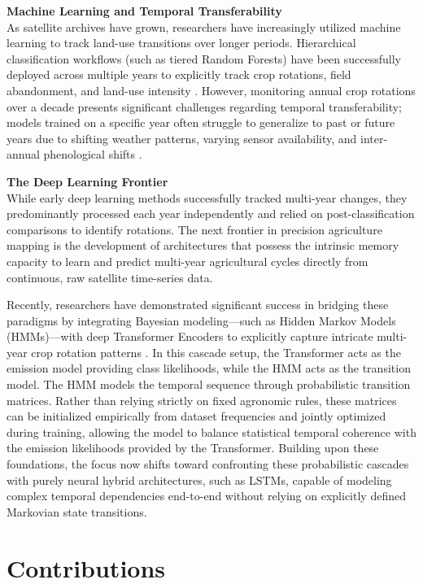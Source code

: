 \textbf{Machine Learning and Temporal Transferability} \\
As satellite archives have grown, researchers have increasingly utilized machine learning to track land-use transitions over longer periods.
Hierarchical classification workflows (such as tiered Random Forests) have been successfully deployed across multiple years to explicitly track crop rotations,
field abandonment, and land-use intensity \cite{brickner_field_2025}.
However, monitoring annual crop rotations over a decade presents significant challenges regarding temporal transferability;
models trained on a specific year often struggle to generalize to past or future years due to shifting weather patterns,
varying sensor availability, and inter-annual phenological shifts \cite{pham_temporally_2024}. 

\textbf{The Deep Learning Frontier} \\
While early deep learning methods successfully tracked multi-year changes,
they predominantly processed each year independently and relied on post-classification comparisons to identify rotations.
The next frontier in precision agriculture mapping is the development of architectures that possess the intrinsic memory capacity to learn
and predict multi-year agricultural cycles directly from continuous, raw satellite time-series data.

Recently, researchers have demonstrated significant success in bridging these paradigms by integrating Bayesian modeling---such
as Hidden Markov Models (HMMs)---with deep Transformer Encoders to explicitly capture intricate multi-year crop rotation patterns \cite{perantoni_bayesian_2024}. 
In this cascade setup, the Transformer acts as the emission model providing class likelihoods, while the HMM acts as the transition model.
The HMM models the temporal sequence through probabilistic transition matrices.
Rather than relying strictly on fixed agronomic rules, these matrices can be initialized empirically
from dataset frequencies and jointly optimized during training, allowing the model to balance statistical
temporal coherence with the emission likelihoods provided by the Transformer.
Building upon these foundations, the focus now shifts toward confronting these probabilistic cascades with purely neural hybrid architectures,
such as LSTMs, capable of modeling complex temporal dependencies end-to-end without relying on explicitly defined Markovian state transitions.


\section{Contributions}
\label{sec:contributions}

